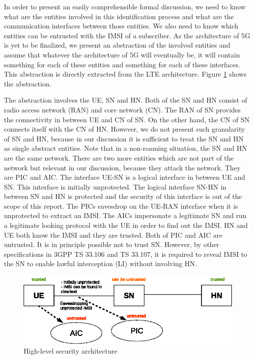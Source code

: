 \documentclass[runningheads,a4paper]{llncs} %
\begin{document}
In order to present an easily comprehensible formal discussion, we need to know what are the entities involved in this identification process and what are the communication interfaces between those entities. We also need to know which entities can be entrusted with the IMSI of a subscriber. As the architecture of 5G is yet to be finalized, we present an abstraction of the involved entities and assume that whatever the architecture of 5G will eventually be, it will contain something for each of these entities and something for each of these interfaces. This abstraction is directly extracted from the LTE architecture. Figure \ref{fig:security_architecture_abstraction} shows the abstraction.

The abstraction involves the UE, SN and HN. Both of the SN and HN consist of radio access network (RAN) and core network (CN). The RAN of SN provides the connectivity in between UE and CN of SN. On the other hand, the CN of SN connects itself with the CN of HN. However, we do not present such granularity of SN and HN, because in our discussion it is sufficient to treat the SN and HN as single abstract entities. Note that in a non-roaming situation, the SN and HN are the same network. There are two more entities which are not part of the network but relevant in our discussion, because they attack the network. They are PIC and AIC. The interface UE-SN is a logical interface in between UE and SN. This interface is initially unprotected. The logical interface SN-HN in between SN and HN is protected and the security of this interface is out of the scope of this report. The PICs eavesdrop on the UE-RAN interface when it is unprotected to extract an IMSI. The AICs impersonate a legitimate SN and run a legitimate looking protocol with the UE in order to find out the IMSI. HN and UE both know the IMSI and they are trusted. Both of PIC and AIC are untrusted. It is in principle possible not to trust SN. However, by other specifications in 3GPP TS 33.106 and TS 33.107, it is required to reveal IMSI to the SN to enable lawful interception (LI) without involving HN.

\begin{figure}
\begin{center}
  \includegraphics[width=.98\textwidth]{security_architecture_abstraction.eps}
\caption{High-level security architecture}
\label{fig:security_architecture_abstraction}       %
\end{center}
\end{figure}
\end{document}
